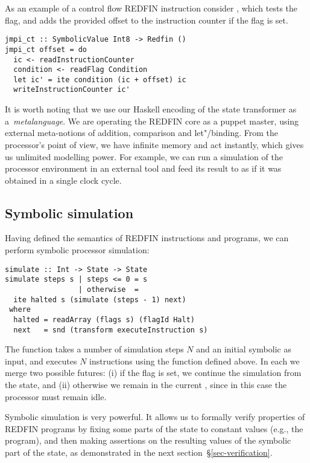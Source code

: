 As an example of a control flow REDFIN instruction consider , which
tests the~ flag, and adds the provided offset to the instruction
counter if the flag is set.

\begin{verbatim}
jmpi_ct :: SymbolicValue Int8 -> Redfin ()
jmpi_ct offset = do
  ic <- readInstructionCounter
  condition <- readFlag Condition
  let ic' = ite condition (ic + offset) ic
  writeInstructionCounter ic'
\end{verbatim}

\noindent
It is worth noting that we use our
Haskell encoding of the state transformer as a~\emph{metalanguage}. We are
operating the REDFIN core as a puppet master, using external
meta-notions of addition,
comparison and let"/binding. From the processor's
point of view, we have infinite memory and act instantly, which gives us unlimited
modelling power. For example, we can run a simulation of the processor environment
in an external tool and feed its result to  as if it was
obtained in a single clock cycle.

\subsection{Symbolic simulation}

Having defined the semantics of REDFIN instructions and programs, we can
perform symbolic processor simulation:

\begin{verbatim}
simulate :: Int -> State -> State
simulate steps s | steps <= 0 = s
                 | otherwise  =
  ite halted s (simulate (steps - 1) next)
 where
  halted = readArray (flags s) (flagId Halt)
  next   = snd (transform executeInstruction s)
\end{verbatim}

\noindent
The function takes a number of simulation steps $N$ and an initial symbolic
 as input, and executes $N$ instructions using the function
 defined above. In each  we merge two possible
futures: (i) if the  flag is set, we continue the
simulation from the  state, and (ii) otherwise we remain in the current
, since in this case the processor must remain idle.

Symbolic simulation is very powerful. It allows us to formally verify properties
of REDFIN programs by fixing some parts of the state to constant values (e.g.,
the program), and then making assertions on the resulting values of
the symbolic part of the state, as demonstrated in the next
section~\S\ref{sec-verification}.

